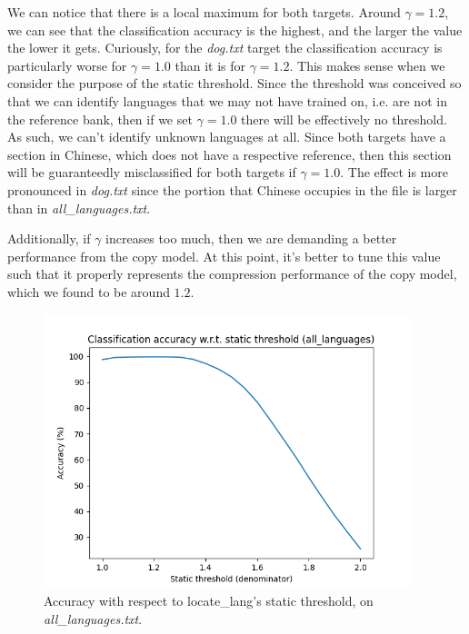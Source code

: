 \documentclass{article}
\begin{document}
We can notice that there is a local maximum for both targets.
Around $\gamma = 1.2$, we can see that the classification accuracy is the highest, and the larger the value the lower it gets.
Curiously, for the \textit{dog.txt} target the classification accuracy is particularly worse for $\gamma = 1.0$ than it is for $\gamma = 1.2$.
This makes sense when we consider the purpose of the static threshold.
Since the threshold was conceived so that we can identify languages that we may not have trained on, i.e. are not in the reference bank, then if we set $\gamma = 1.0$ there will be effectively no threshold.
As such, we can't identify unknown languages at all.
Since both targets have a section in Chinese, which does not have a respective reference, then this section will be guaranteedly misclassified for both targets if $\gamma = 1.0$.
The effect is more pronounced in \textit{dog.txt} since the portion that Chinese occupies in the file is larger than in \textit{all_languages.txt}.

Additionally, if $\gamma$ increases too much, then we are demanding a better performance from the copy model.
At this point, it's better to tune this value such that it properly represents the compression performance of the copy model, which we found to be around $1.2$.

\begin{figure}
    \centering
    \includegraphics[width=0.95\textwidth]{../results/ll_all_languages/ll-s.png}
    \caption{Accuracy with respect to locate_lang's static threshold, on \textit{all_languages.txt}.}
    \label{fig:ll_s_all_languages}
\end{figure}
\end{document}
